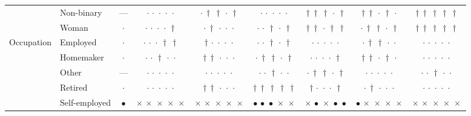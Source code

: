 {\begin{longtable}[t]{llccccccc}
 & Non-binary & --- & ${\cdot}\,{\cdot}\,{\cdot}\,{\cdot}\,{\cdot}$ & ${\cdot}\,{\dagger}\,{\dagger}\,{\cdot}\,{\dagger}$ & ${\cdot}\,{\cdot}\,{\cdot}\,{\cdot}\,{\cdot}$ & ${\dagger}\,{\dagger}\,{\dagger}\,{\cdot}\,{\dagger}$ & ${\dagger}\,{\dagger}\,{\cdot}\,{\dagger}\,{\cdot}$ & ${\dagger}\,{\dagger}\,{\dagger}\,{\dagger}\,{\dagger}$ \\
 & Woman & $\cdot$ & ${\cdot}\,{\cdot}\,{\cdot}\,{\cdot}\,{\dagger}$ & ${\cdot}\,{\dagger}\,{\cdot}\,{\cdot}\,{\cdot}$ & ${\cdot}\,{\cdot}\,{\dagger}\,{\cdot}\,{\dagger}$ & ${\dagger}\,{\dagger}\,{\cdot}\,{\dagger}\,{\dagger}$ & ${\cdot}\,{\dagger}\,{\dagger}\,{\cdot}\,{\dagger}$ & ${\dagger}\,{\dagger}\,{\dagger}\,{\dagger}\,{\dagger}$ \\
\cline{1-9}
\multirow[t]{7}{*}{Occupation} & Employed & $\cdot$ & ${\cdot}\,{\cdot}\,{\cdot}\,{\dagger}\,{\dagger}$ & ${\dagger}\,{\cdot}\,{\cdot}\,{\cdot}\,{\cdot}$ & ${\cdot}\,{\cdot}\,{\dagger}\,{\cdot}\,{\dagger}$ & ${\cdot}\,{\cdot}\,{\cdot}\,{\cdot}\,{\cdot}$ & ${\cdot}\,{\dagger}\,{\dagger}\,{\cdot}\,{\cdot}$ & ${\cdot}\,{\cdot}\,{\cdot}\,{\cdot}\,{\cdot}$ \\
 & Homemaker & $\cdot$ & ${\cdot}\,{\cdot}\,{\dagger}\,{\cdot}\,{\cdot}$ & ${\dagger}\,{\dagger}\,{\cdot}\,{\cdot}\,{\cdot}$ & ${\cdot}\,{\dagger}\,{\dagger}\,{\cdot}\,{\dagger}$ & ${\cdot}\,{\cdot}\,{\cdot}\,{\cdot}\,{\dagger}$ & ${\dagger}\,{\dagger}\,{\cdot}\,{\dagger}\,{\cdot}$ & ${\cdot}\,{\cdot}\,{\cdot}\,{\cdot}\,{\cdot}$ \\
 & Other & --- & ${\cdot}\,{\cdot}\,{\cdot}\,{\cdot}\,{\cdot}$ & ${\cdot}\,{\cdot}\,{\cdot}\,{\cdot}\,{\cdot}$ & ${\cdot}\,{\cdot}\,{\dagger}\,{\cdot}\,{\cdot}$ & ${\cdot}\,{\dagger}\,{\dagger}\,{\cdot}\,{\dagger}$ & ${\cdot}\,{\cdot}\,{\cdot}\,{\cdot}\,{\cdot}$ & ${\cdot}\,{\cdot}\,{\dagger}\,{\cdot}\,{\cdot}$ \\
 & Retired & $\cdot$ & ${\cdot}\,{\cdot}\,{\cdot}\,{\cdot}\,{\cdot}$ & ${\dagger}\,{\dagger}\,{\cdot}\,{\cdot}\,{\cdot}$ & ${\dagger}\,{\dagger}\,{\dagger}\,{\dagger}\,{\dagger}$ & ${\dagger}\,{\cdot}\,{\cdot}\,{\cdot}\,{\dagger}$ & ${\cdot}\,{\dagger}\,{\cdot}\,{\cdot}\,{\cdot}$ & ${\cdot}\,{\cdot}\,{\cdot}\,{\cdot}\,{\cdot}$ \\
 & Self-employed & $\bullet$ & ${\times}\,{\times}\,{\times}\,{\times}\,{\times}$ & ${\times}\,{\times}\,{\times}\,{\times}\,{\times}$ & ${\bullet}\,{\bullet}\,{\bullet}\,{\times}\,{\times}$ & ${\times}\,{\bullet}\,{\times}\,{\bullet}\,{\bullet}$ & ${\bullet}\,{\times}\,{\times}\,{\times}\,{\times}$ & ${\times}\,{\times}\,{\times}\,{\times}\,{\times}$ \\

\end{longtable}}
